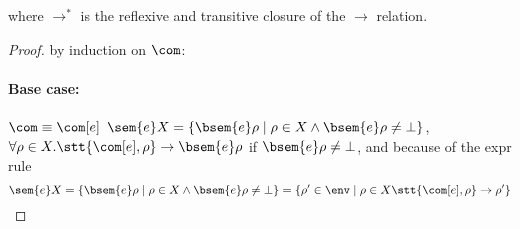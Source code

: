 where \(\to^*\) is the reflexive and transitive closure of the \(\to\)
relation.

\begin{proof}
  by induction on \(\com\):
  \paragraph*{Base case:\\}
  \(\com \equiv \com[e]\) \newline
  \(\sem{e}X = \{\bsem{e}\rho \mid \rho \in X \wedge \bsem{e}\rho \neq
  \bot \}\),
  \(\forall \rho \in X . \stt{\com[e], \rho} \to \bsem{e}\rho\) if
  \(\bsem{e}\rho \neq \bot\), and because of the expr rule
  \[\sem{e}X = \{\bsem{e}\rho \mid \rho \in X \wedge \bsem{e}\rho \neq
    \bot \} = \{\rho' \in\env \mid \rho \in X \stt{\com[e], \rho} \to
    \rho'\}\]

\end{proof}
